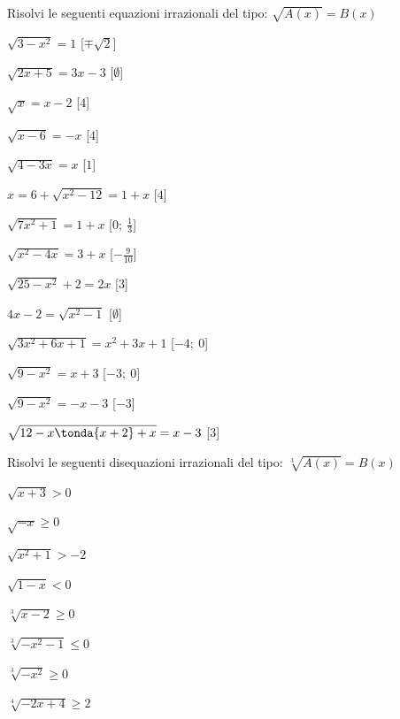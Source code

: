 \begin{esercizio}\label{ese:03.1}
Risolvi le seguenti equazioni irrazionali del tipo:
\(\sqrt{A(x)} = B(x)\)
\begin{multicols}{2}
\begin{enumeratea}
\item \(\sqrt{3 -x^2} = 1\) \hfill [\(\mp \sqrt{2}\)]
\item \(\sqrt{2x +5} = 3x -3\) \hfill [\(\emptyset\)]
\item \(\sqrt{x} = x-2\) \hfill [\(4\)]
\item \(\sqrt{x -6} = -x\) \hfill [\(4\)]
\item \(\sqrt{4 -3x} = x\) \hfill [\(1\)]
\item \(x = 6 +\sqrt{x^2 -12} = 1 +x\) \hfill [\(4\)]
\item \(\sqrt{7x^2 +1} = 1 +x\) \hfill [\(0;~\frac{1}{3}\)]
\item \(\sqrt{x^2 -4x} = 3 +x\) \hfill [\(-\frac{9}{10}\)]
\item \(\sqrt{25 -x^2} +2 = 2x\) \hfill [\(3\)]
\item \(4x -2 = \sqrt{x^2 -1}\) \hfill [\(\emptyset\)]
\item \(\sqrt{3x^2 +6x +1} = x^2 +3x +1\) \hfill [\(-4;~0\)]
\item \(\sqrt{9 -x^2} = x +3\) \hfill [\(-3;~0\)]
\item \(\sqrt{9 -x^2} = -x -3\) \hfill [\(-3\)]
\item \(\sqrt{12 -x\tonda{x +2} +x} = x -3\) \hfill [\(3\)]
\end{enumeratea}
\end{multicols}
\end{esercizio}

\begin{esercizio}\label{ese:03.1}
Risolvi le seguenti disequazioni irrazionali del tipo:
\(\sqrt[3]{A(x)} = B(x)\)
\begin{multicols}{2}
\begin{enumeratea}
\item \(\sqrt{x+3} > 0\)
\item \(\sqrt{-x} \geq 0 \)
\item \(\sqrt{x^2 +1} > -2 \)
\item \(\sqrt{1 -x} < 0\)
\item \(\sqrt[3]{x-2} \geq 0\)
\item \(\sqrt[3]{-x^2-1} \leq 0\)
\item \(\sqrt[3]{-x^2} \geq 0\)
\item \(\sqrt[4]{-2x +4} \geq 2\)
\end{enumeratea}
\end{multicols}
\end{esercizio}

